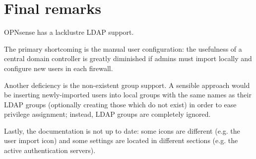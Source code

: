 \documentclass[draft]{homework}
\newcommand{\opn}{OPNsense\xspace}
\begin{document}
    
    \section{Final remarks}
    \opn has a lacklustre LDAP support.
    
    The primary shortcoming is the manual user configuration: the usefulness of a central domain controller is greatly diminished if admins must import locally and configure new users in each firewall.
    
    Another deficiency is the non-existent group support.
    A sensible approach would be inserting newly-imported users into local groups with the same names as their LDAP groups (optionally creating those which do not exist) in order to ease privilege assignment; instead, LDAP groups are completely ignored.
    
    Lastly, the documentation is not up to date: some icons are different (e.g. the user import icon) and some settings are located in different sections (e.g. the active authentication servers).
\end{document}
